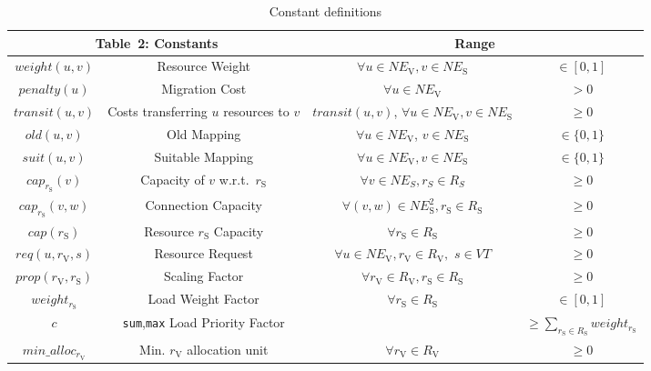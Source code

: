 \documentclass[conference,10pt]{IEEEtran}
\newcommand{\mrm}{\mathrm}
\begin{document}
\begin{table*} [th]
\begin{center}
\begin{scriptsize}
\begin{tabular}{ | c | c | c | c |}
\hline
\multicolumn{2}{|c|}{Table~2: Constants} & \multicolumn{2}{|c|}{Range}\\
\hline
  $weight(u,v)$ & Resource Weight & $\forall u \in NE_\mrm{V}, v \in NE_\mrm{S}$ & $\in [0,1]$\\
  $penalty(u)$ & Migration Cost & $\forall u \in NE_\mrm{V}$ & $> 0$\\
  $transit(u,v)$ & Costs transferring $u$ resources to $v$ & $transit(u,v)$, $\forall u \in NE_{\mrm{V}}, v \in NE_\mrm{S}$ & $\geq 0$ \\
  $old(u,v)$ & Old Mapping & $\forall u \in NE_\mrm{V}$, $v \in NE_\mrm{S}$ & $\in \{0,1\}$\\
  $suit(u,v)$ & Suitable Mapping & $\forall u \in NE_\mrm{V}, v \in NE_\mrm{S}$ & $\in \{0,1\}$\\
  $cap_{r_\mrm{S}}(v)$ & Capacity of $v$ w.r.t.~$r_\mrm{S}$ & $\forall v \in NE_S, r_S \in R_S$ & $\geq 0$\\
  $cap_{r_\mrm{S}}(v,w)$ & Connection Capacity & $\forall (v,w) \in NE^2_\mrm{S}, r_\mrm{S} \in R_\mrm{S}$ & $\geq 0$\\
  $cap(r_\mrm{S})$ & Resource $r_\mrm{S}$ Capacity & $\forall r_\mrm{S} \in R_\mrm{S}$ & $\geq 0$\\
$req(u,r_\mrm{V},s)$ & Resource Request & $\forall u \in NE_\mrm{V}, r_\mrm{V} \in R_\mrm{V},$ $ s \in VT$ & $\geq 0$\\
$prop(r_\mrm{V},r_\mrm{S})$ & Scaling Factor & $\forall r_\mrm{V} \in R_\mrm{V}, r_\mrm{S} \in R_\mrm{S}$ & $\geq 0$\\
  $weight_{r_\mrm{S}}$ & Load Weight Factor& $\forall r_\mrm{S} \in R_\mrm{S}$ & $\in [0,1]$\\
  $c$ & \texttt{sum},\texttt{max} Load Priority Factor & & $\geq \sum_{r_\mrm{S} \in R_\mrm{S}}weight_{r_\mrm{S}}$\\
  $min\_alloc_{r_\mrm{V}}$ & Min. $r_\mrm{V}$ allocation unit & $\forall r_\mrm{V} \in R_\mrm{V}$ & $\geq 0$\\
  \hline
\end{tabular}\label{consts}
\end{scriptsize}
\end{center}
\caption{Constant definitions\label{tab:constants}}
\end{table*}
\end{document}
